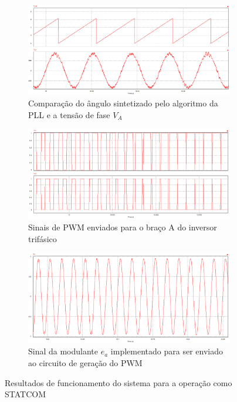 \begin{figure}[!hbt]
	\centering
	\begin{subfigure}[b]{0.7\textwidth}
		\centering
		\includegraphics[width=\textwidth]{figuras/sim_figures/statcom/teta.PNG}
		\caption{Comparação do ângulo sintetizado pelo algoritmo da PLL e a tensão de fase $V_A$}
	\end{subfigure}
	
	\begin{subfigure}[b]{0.7\textwidth}
		\centering
		\includegraphics[width=\textwidth]{figuras/sim_figures/statcom/pwm.PNG}
		\caption{Sinais de PWM enviados para o braço A do inversor trifásico}
	\end{subfigure}

	\begin{subfigure}[b]{0.7\textwidth}
		\centering
		\includegraphics[width=\textwidth]{figuras/sim_figures/statcom/modulante.PNG}
		\caption{Sinal da modulante $e_a$ implementado para ser enviado ao circuito de geração do PWM}
	\end{subfigure}

	\caption{Resultados de funcionamento do sistema para a operação como STATCOM}
    \label{fig:sim-statcom2}
\end{figure}


